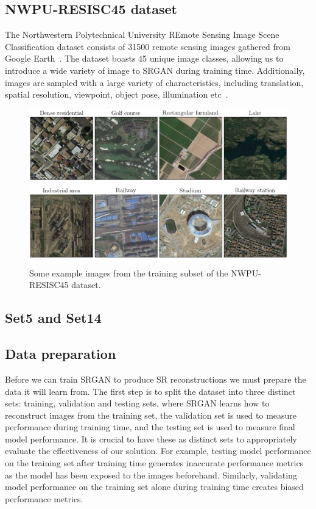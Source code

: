\subsection{NWPU-RESISC45 dataset}\label{subsec:resisc45}
The Northwestern Polytechnical University REmote Sensing Image Scene Classification dataset consists of 31500 remote sensing images gathered from Google Earth~\cite{resisc45}. The dataset boasts 45 unique image classes, allowing us to introduce a wide variety of image to SRGAN during training time. Additionally, images are sampled with a large variety of characteristics, including translation, spatial resolution, viewpoint, object pose, illumination etc~\cite{resisc45}.
\begin{figure}
    \includegraphics[width=\linewidth]{./assets/resisc45_example.png}
    \caption{Some example images from the training subset of the NWPU-RESISC45 dataset.}
    \label{fig:resisc45_examples}
\end{figure}

\subsection{Set5 and Set14}

\subsection{Data preparation}\label{subsec:data_preparation}
Before we can train SRGAN to produce SR reconstructions we must prepare the data it will learn from. The first step is to split the dataset into three distinct sets: training, validation and testing sets, where SRGAN learns how to reconstruct images from the training set, the validation set is used to measure performance during training time, and the testing set is used to measure final model performance. It is crucial to have these as distinct sets to appropriately evaluate the effectiveness of our solution. For example, testing model performance on the training set after training time generates inaccurate performance metrics as the model has been exposed to the images beforehand. Similarly, validating model performance on the training set alone during training time creates biased performance metrics.

